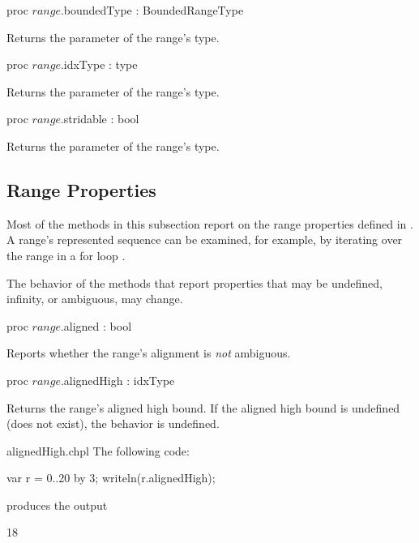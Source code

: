 \begin{protohead}
proc $range$.boundedType : BoundedRangeType
\end{protohead}
\begin{protobody}
Returns the  parameter of the range's type.
\end{protobody}

\begin{protohead}
proc $range$.idxType : type
\end{protohead}
\begin{protobody}
Returns the  parameter of the range's type.
\end{protobody}

\begin{protohead}
proc $range$.stridable : bool
\end{protohead}
\begin{protobody}
Returns the  parameter of the range's type.
\end{protobody}

\subsection{Range Properties}
\label{Range_Properties}

Most of the methods in this subsection report on
the range properties defined in .
A range's represented sequence can be examined, for example,
by iterating over the range in a for loop .

\begin{openissue}
The behavior of the methods that report properties that may be
undefined, infinity, or ambiguous, may change.
\end{openissue}

\begin{protohead}
proc $range$.aligned : bool
\end{protohead}
\begin{protobody}
Reports whether the range's alignment is \emph{not} ambiguous.
\end{protobody}

\begin{protohead}
proc $range$.alignedHigh : idxType
\end{protohead}
\begin{protobody}
Returns the range's aligned high bound.
If the aligned high bound is undefined (does not exist),
the behavior is undefined.
\end{protobody}
\begin{chapelexample}{alignedHigh.chpl}
The following code:
\begin{chapel}
var r = 0..20 by 3;
writeln(r.alignedHigh);
\end{chapel}
produces the output
\begin{chapelprintoutput}
18
\end{chapelprintoutput}
\end{chapelexample}

